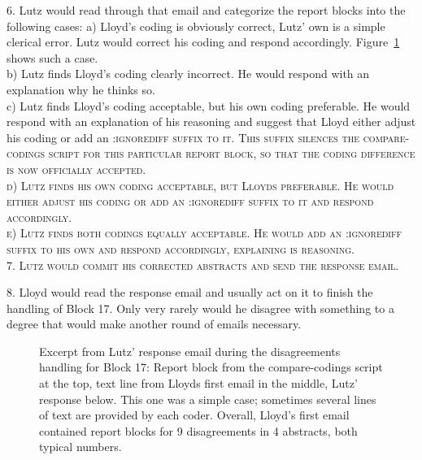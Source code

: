 \documentclass[10pt,journal,compsoc]{IEEEtran}
\newcommand{\Cb}[1]{\bgroup\scshape #1\egroup}  %
\newcommand{\Prg}[1]{\bgroup\ttfamily #1\egroup}  %
\begin{document}
6. Lutz would read through that email and categorize the report blocks into the following cases:
a) Lloyd's coding is obviously correct, Lutz' own is a simple clerical error.
Lutz would correct his coding and respond accordingly.
Figure~\ref{email-MeyAlmKel22.png} shows such a case.\\
b) Lutz finds Lloyd's coding clearly incorrect. 
He would respond with an explanation why he thinks so.\\
c) Lutz finds Lloyd's coding acceptable, but his own coding preferable.
He would respond with an explanation of his reasoning and suggest that Lloyd
either adjust his coding or add an \Cb{:ignorediff} suffix to it.
This suffix silences the \Prg{compare-codings} script for this particular report block,
so that the coding difference is now officially accepted.\\
d) Lutz finds his own coding acceptable, but Lloyds preferable.
He would either adjust his coding or add an \Cb{:ignorediff} suffix to it
and respond accordingly.\\
e) Lutz finds both codings equally acceptable.
He would add an \Cb{:ignorediff} suffix to his own
and respond accordingly, explaining is reasoning.\\

7. Lutz would commit his corrected abstracts and send the response email.

8. Lloyd would read the response email and usually act on it to finish the handling of 
Block 17.
Only very rarely would he disagree with something to a degree that would make
another round of emails necessary.

\begin{figure}%
	\centering{}%
	\vspace{-2mm}\caption{Excerpt from Lutz' response email during the disagreements handling
	  for Block 17: 
	  Report block from the \Prg{compare-codings} script at the top,
	  text line from Lloyds first email in the middle,
	  Lutz' response below.
	  This one was a simple case; 
	  sometimes several lines of text are provided by each coder.
	  Overall, Lloyd's first email contained report blocks for 9 disagreements
	  in 4 abstracts, both typical numbers.}\label{email-MeyAlmKel22.png}%
\end{figure}
\end{document}
